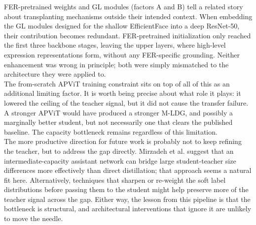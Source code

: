 FER-pretrained weights and GL modules (factors A and B) tell a related story about transplanting mechanisms outside their intended context. When embedding the GL modules designed for the shallow EfficientFace into a deep ResNet-50, their contribution becomes redundant. FER-pretrained initialization only reached the first three backbone stages, leaving the upper layers, where high-level expression representations form, without any FER-specific grounding. Neither enhancement was wrong in principle; both were simply mismatched to the architecture they were applied to.\\

The from-scratch APViT training constraint sits on top of all of this as an additional limiting factor. It is worth being precise about what role it plays: it lowered the ceiling of the teacher signal, but it did not cause the transfer failure. A stronger APViT would have produced a stronger M-LDG, and possibly a marginally better student, but not necessarily one that clears the published baseline. The capacity bottleneck remains regardless of this limitation.\\

The more productive direction for future work is probably not to keep refining the teacher, but to address the gap directly. Mirzadeh et al. \cite{mirzadeh2020takd} suggest that an intermediate-capacity assistant network can bridge large student-teacher size differences more effectively than direct distillation; that approach seems a natural fit here. Alternatively, techniques that sharpen or re-weight the soft label distributions before passing them to the student might help preserve more of the teacher signal across the gap. Either way, the lesson from this pipeline is that the bottleneck is structural, and architectural interventions that ignore it are unlikely to move the needle. 